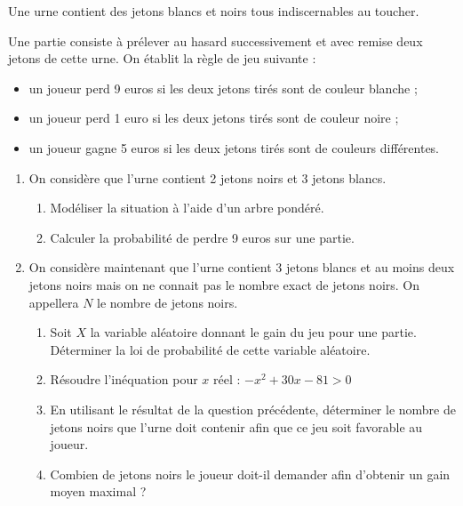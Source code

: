 \documentclass[11pt,fleqn, openany]{book} %
\begin{document}
\begin{exercise}[subtitle={(Centres étrangers 2022)}]
Une urne contient des jetons blancs et noirs tous indiscernables au toucher.

Une partie consiste à prélever au hasard successivement et avec remise deux jetons de cette urne. On établit la règle de jeu suivante :
\begin{itemize}
\item un joueur perd 9 euros si les deux jetons tirés sont de couleur blanche ;
\item un joueur perd 1 euro si les deux jetons tirés sont de couleur noire ;
\item un joueur gagne 5 euros si les deux jetons tirés sont de couleurs différentes.
\end{itemize}

\begin{enumerate} 
\item On considère que l'urne contient 2 jetons noirs et 3 jetons blancs.
 \begin{enumerate}
\item Modéliser la situation à l'aide d'un arbre pondéré.
\item Calculer la probabilité de perdre 9 euros sur une partie.\end{enumerate}
\item On considère maintenant que l'urne contient 3 jetons blancs et au moins deux jetons noirs
mais on ne connait pas le nombre exact de jetons noirs. On appellera $N$ le nombre de jetons
noirs.
\begin{enumerate} \item Soit $X$ la variable aléatoire donnant le gain du jeu pour une partie.
Déterminer la loi de probabilité de cette variable aléatoire.
\item Résoudre l'inéquation pour $x$ réel : $-x^2+30x-81>0$
\item En utilisant le résultat de la question précédente, déterminer le nombre de jetons noirs
que l'urne doit contenir afin que ce jeu soit favorable au joueur.
\item Combien de jetons noirs le joueur doit-il demander afin d'obtenir un gain moyen maximal ?\end{enumerate}\end{enumerate}\end{exercise}
\end{document}
